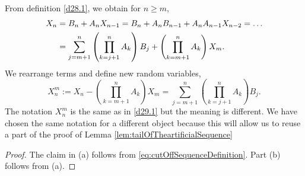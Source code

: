 \documentclass[bj]{imsart}
\numberwithin{equation}{section}
\newcommand{\1}{\mathbf{1}}
\theoremstyle{definition}
\begin{document}
\rm

From  definition \eqref{d28.1}, we obtain for $n\geq m$,
\begin{align}\label{d29.2}
 X_n&=B_n+A_nX_{n-1}=B_n+A_nB_{n-1}+ A_nA_{n-1}X_{n-2}=\ldots\\
&=\sum_{j=m+1}^n\left(\prod_{k=j+1}^n A_k\right)B_j + \left(\prod_{k=m+1}^nA_k\right)X_m.\notag
\end{align}
We rearrange terms and define new random variables,
\begin{equation}\label{eq:cutOffSequenceDefinition}
X_n^m:=X_n - \left(\prod_{k=m+1}^nA_k\right)X_m = \sum_{j=m+1}^n\left(\prod_{k=j+1}^n A_k\right)B_j.
\end{equation}
The notation $X^m_n$ is the same as in \eqref{d29.1} but the meaning is different. We have chosen the same notation for a different object because this will allow us to reuse a part of  the proof of Lemma \ref{lem:tailOfTheartificialSequence}

\begin{proof}
The claim in (a) follows from \eqref{eq:cutOffSequenceDefinition}. Part (b) follows from (a).
\end{proof}
\end{document}
